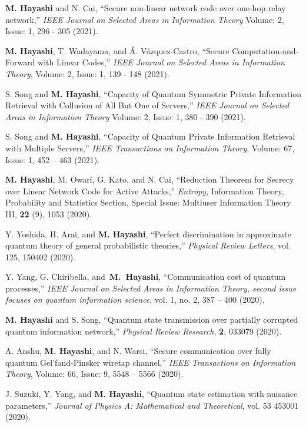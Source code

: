 \documentclass[a4paper,12pt,oneside]{article}
\begin{document}
\begin{enumerate}
\textbf{M. Hayashi} and N. Cai,
``Secure non-linear network code over one-hop relay network,''
{\em IEEE Journal on Selected Areas in Information Theory}
Volume: 2, Issue: 1, 296 - 305 (2021).

\textbf{M. Hayashi}, T. Wadayama, and \'{A}. V\'{a}zquez-Castro,
``Secure Computation-and-Forward with Linear Codes,''
{\em IEEE Journal on Selected Areas in Information Theory},
Volume: 2, Issue: 1, 139 - 148 (2021).

S. Song and \textbf{M. Hayashi},
``Capacity of Quantum Symmetric Private Information Retrieval with Collusion of All But One of Servers,''
{\em IEEE Journal on Selected Areas in Information Theory}
Volume: 2, Issue: 1, 380 - 390 (2021).

S. Song and \textbf{M. Hayashi},
``Capacity of Quantum Private Information Retrieval with Multiple Servers,''
{\em IEEE Transactions on Information Theory}, 
Volume: 67, Issue: 1, 452 -- 463 (2021). 

\textbf{M. Hayashi}, M. Owari, G. Kato, and N. Cai,
``Reduction Theorem for Secrecy over Linear Network
Code for Active Attacks,''
{\em Entropy}, Information Theory, Probability and Statistics Section, Special Issue: Multiuser Information Theory III,  
{\bf 22} (9), 1053 (2020).

Y. Yoshida, H. Arai, and \textbf{M. Hayashi},
``Perfect discrimination in approximate quantum theory of general probabilistic theories,''
{\em Physical Review Letters}, 
vol. 125, 150402 (2020).

Y. Yang, G. Chiribella,  and~\textbf{M.~Hayashi},
``Communication cost of quantum processes,''
{\em IEEE Journal on Selected Areas in Information Theory, second issue focuses on quantum information science},
vol. 1, no. 2, 387 -- 400 (2020).
 
\textbf{M. Hayashi} and S. Song,
``Quantum state transmission over partially corrupted quantum information network,''
{\em Physical Review Research},  {\bf 2}, 033079 (2020).

A. Anshu, \textbf{M. Hayashi}, and N. Warsi,   
``Secure communication over fully quantum Gel'fand-Pinsker wiretap channel,''
{\em IEEE Transactions on Information Theory}, 
Volume: 66, Issue: 9, 5548 -- 5566 (2020). 

J. Suzuki, Y. Yang, and \textbf{M. Hayashi},
``Quantum state estimation with nuisance parameters,'' 
{\em Journal of Physics A: Mathematical and Theoretical}, 
vol. 53 453001 (2020). 


\end{enumerate}
\end{document}
